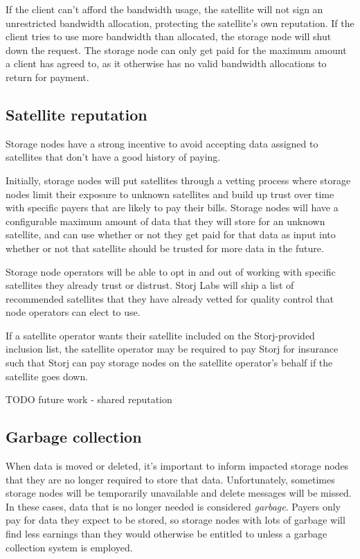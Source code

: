 \documentclass[a4paper,10pt]{article} \usepackage[utf8]{inputenc}
\newcommand{\todo}[1]{{\color{red} TODO #1 }}
\begin{document}
If the client can't afford the bandwidth usage, the satellite will not sign an
unrestricted bandwidth allocation, protecting the satellite's own reputation.
If the client tries to use more bandwidth than allocated,
the storage node will shut down the request.
The storage node can only get paid for the maximum amount a client has agreed
to,
as it otherwise has no valid bandwidth allocations to return for
payment.

\subsection{Satellite reputation}

Storage nodes have a strong incentive to avoid accepting data assigned to
satellites that don't have a good history of paying.

Initially, storage nodes will put satellites through a vetting process
where storage nodes limit their exposure to unknown satellites and build up
trust over time with specific payers that are likely to pay their bills.
Storage nodes
will have a configurable maximum amount of data that they will store for an
unknown satellite, and can use whether or not they get paid for that data
as input into
whether or not that satellite should be trusted for more data in the future.

Storage node operators will be able to opt in and out of working
with specific satellites they already trust or distrust.
Storj Labs will ship a list of recommended satellites that
they have already vetted for quality control that
node operators can elect to use.

If a satellite operator wants their
satellite included on the Storj-provided inclusion list, the satellite operator
may be required to pay Storj for insurance such that Storj can pay storage
nodes on the satellite operator's behalf if the satellite goes down.

\todo{future work - shared reputation}

\subsection{Garbage collection}

When data is moved or deleted, it's important to inform impacted storage nodes
that they are no longer required to store that data. Unfortunately, sometimes
storage nodes will be temporarily unavailable and delete messages will be
missed. In these cases, data that is no longer needed is considered
{\em garbage}. Payers only pay for data they expect to be stored, so storage
nodes with lots of garbage will find less earnings than they would
otherwise be entitled to unless a garbage collection system is employed.
\end{document}
